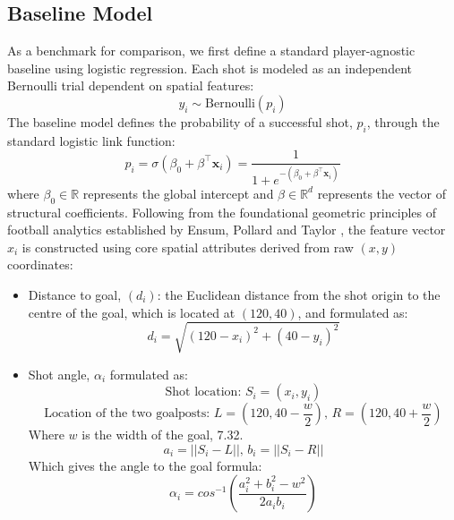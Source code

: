 \documentclass{article}
\begin{document}
\subsection{Baseline Model}
As a benchmark for comparison, we first define a standard player-agnostic baseline using logistic regression. Each shot is modeled as an independent Bernoulli trial dependent on spatial features:
\begin{equation}
    y_i \sim \text{Bernoulli}(p_i)
\end{equation}
The baseline model defines the probability of a successful shot, $p_i$, through the standard logistic link function:
\begin{equation}
    p_i = \sigma(\beta_0 + \beta^\top \mathbf{x}_i) = \frac{1}{1 + e^{-(\beta_0 + \beta^\top \mathbf{x}_i)}}
\end{equation}
where $\beta_0 \in \mathbb{R}$ represents the global intercept and $\beta \in \mathbb{R}^d$ represents the vector of structural coefficients. Following from the foundational geometric principles of football analytics established by Ensum, Pollard and Taylor \cite{ensum2004}, the feature vector $x_i$ is constructed using core spatial attributes derived from raw $(x, y)$ coordinates:
\begin{itemize}
    \item Distance to goal, $(d_i)$: the Euclidean distance from the shot origin to the centre of the goal, which is located at $(120,40)$, and formulated as:
    \begin{equation}
        d_i = \sqrt{(120 - x_i)^2 + (40-y_i)^2}
    \end{equation}
    \item Shot angle, $\alpha_i$ formulated as:
    \begin{equation}
        \text{Shot location: } S_i = (x_i, y_i)
    \end{equation}
    \begin{equation}
        \text{Location of the two goalposts: } L = (120, 40 - \frac{w}{2})\text{, }R = (120, 40 + \frac{w}{2})
    \end{equation}
    Where $w$ is the width of the goal, 7.32.
    \begin{equation}
        a_i = || S_i - L|| \text{, } b_i = ||S_i - R||
    \end{equation}
    Which gives the angle to the goal formula:
    \begin{equation}
        \alpha_i = cos^{-1}(\frac{a_i^2 + b_i^2 - w^2}{2a_ib_i})
    \end{equation}
\end{itemize}
\end{document}
